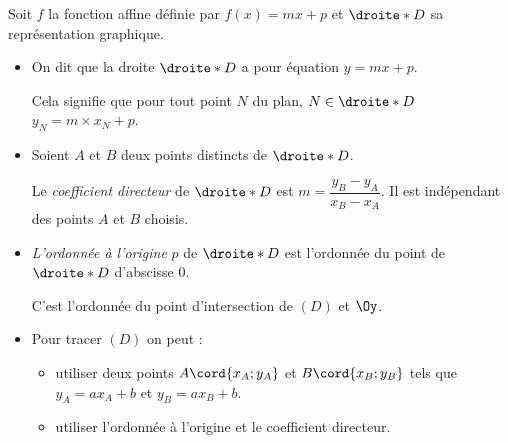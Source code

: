 Soit $f$ la fonction affine définie par $f(x)=mx+p$ et $\droite*{D}$ sa représentation graphique.
\begingroup
\makeatletter
\makeatother
    \begin{itemize}
    \item On dit que la droite $\droite*{D}$ a pour équation $y=mx+p$.
\hfill\def\CoefDir{0.6}
\def\OrdOrig{0.7}
\def\SbDebPente{0.6}
\def\SbLgPente{1}

    Cela signifie que pour tout point $N$ du plan, $N\in\droite*{D}$ \ssi $y_N=m\times x_N+p$.
    \item Soient $A$ et $B$ deux points distincts de $\droite*{D}$.

    Le \emph{coefficient directeur} de $\droite*{D}$ est $m=\dfrac{y_B-y_A}{x_B-x_A}$. 
%    
    Il est indépendant des points $A$ et $B$ choisis.
    \item \emph{L'ordonnée à l'origine} $p$ de $\droite*{D}$ est l'ordonnée du point de $\droite*{D}$ d'abscisse 0. 
    
    C'est l'ordonnée du point d'intersection de $(D)$ et $\Oy$.
    \item Pour tracer $(D)$ on peut :
        \begin{itemize}
        \item  utiliser deux points $A\cord{x_A;y_A}$ et $B\cord{x_B;y_B}$ tels que $y_A=ax_A+b$ et $y_B=ax_B+b$.%
        \item utiliser l'ordonnée à l'origine et le coefficient directeur. 
        \end{itemize}
    \end{itemize}
\endgroup

